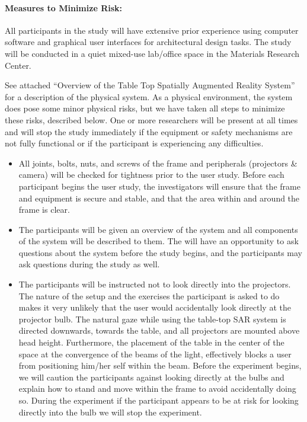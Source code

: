 \documentclass[10pt]{article}
\begin{document}
\paragraph{Measures to Minimize Risk:}
\vspace{0.1in}
\noindent
All participants in the study will have extensive prior experience using
computer software and graphical user interfaces for architectural design tasks. 
The study will be conducted
in a quiet mixed-use lab/office space in the Materials Research Center.


See attached ``Overview of the Table Top Spatially Augmented Reality
System'' for a description of the physical system.  As a physical
environment, the system does pose some minor physical risks, but we
have taken all steps to minimize these risks, described below.  One or
more researchers will be present at all times and will stop the study
immediately if the equipment or safety mechanisms are not fully
functional or if the participant is experiencing any difficulties.

\begin{itemize}

\item All joints, bolts, nuts, and screws of the frame and peripherals
  (projectors \& camera) will be checked for tightness prior to the
  user study.  Before each participant begins the user study, the
  investigators will ensure that the frame and equipment is secure and
  stable, and that the area within and around the frame is clear.

\item The participants will be given an overview of the system and all
  components of the system will be described to them.  The will have
  an opportunity to ask questions about the system before the study
  begins, and the participants may ask questions during the study as well.

\item The participants will be instructed not to look directly into
  the projectors.  The nature of the setup and the exercises the
  participant is asked to do makes it very unlikely that the user
  would accidentally look directly at the projector bulb.  The natural
  gaze while using the table-top SAR system is directed downwards,
  towards the table, and all projectors are mounted above head height.
  Furthermore, the placement of the table in the center of the space
  at the convergence of the beams of the light, effectively blocks a
  user from positioning him/her self within the beam.  Before the
  experiment begins, we will caution the participants against looking
  directly at the bulbs and explain how to stand and move within the
  frame to avoid accidentally doing so.  During the experiment if the
  participant appears to be at risk for looking directly into the bulb
  we will stop the experiment.

\end{itemize}
\end{document}
